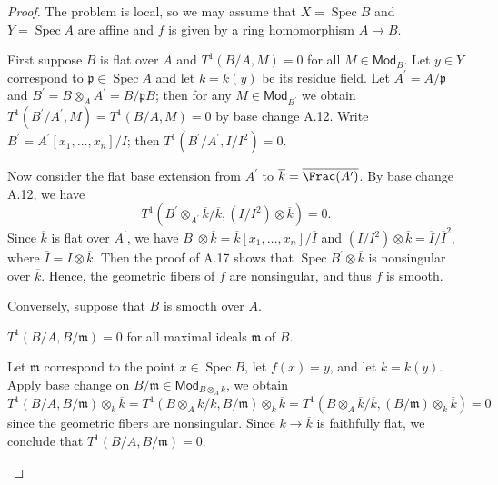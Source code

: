 \documentclass{article}
\theoremstyle{definition}
\newcommand{\Spec}{\operatorname{Spec}}
\begin{document}
\begin{proof}
The problem is local, so we may assume that \(X = \Spec B\) and \(Y = \Spec A\) are affine and \(f\) is given by a ring homomorphism \(A\to B\).

First suppose \(B\) is flat over \(A\) and \(T^{1}(B / A,M) = 0\) for all \(M\in \mathsf{Mod}_{B}\). Let \(y\in Y\) correspond to \(\mathfrak{p}\in \Spec A\) and let \(k = k(y)\) be its residue field. Let \(A^{\prime} = A / \mathfrak{p}\) and \(B^{\prime} = B\otimes_{A}A^{\prime} = B / \mathfrak{p}B\); then for any \(M\in \mathsf{Mod}_{B^{\prime}}\) we obtain \(T^{1}(B^{\prime} / A^{\prime},M) = T^{1}(B / A,M) = 0\) by base change A.12. Write \(B^{\prime} = A^{\prime}[x_{1},\ldots ,x_{n}] / I\); then \(T^{1}(B^{\prime} / A^{\prime},I / I^{2}) = 0\).

Now consider the flat base extension from \(A^{\prime}\) to \(\overline{k} = \overline{\Frac(A^{\prime})}\). By base change A.12, we have
\[
T^{1}(B^{\prime}\otimes_{A^{\prime}}\overline{k} /\overline{k},(I / I^{2})\otimes \overline{k}) = 0.
\]
Since \(\overline{k}\) is flat over \(A^{\prime}\), we have \(B^{\prime}\otimes \overline{k} = \overline{k}[x_{1},\ldots ,x_{n}] / \overline{I}\) and \((I / I^{2})\otimes \overline{k} = \overline{I} / \overline{I}^{2}\), where \(\overline{I} = I\otimes \overline{k}\). Then the proof of A.17 shows that \(\Spec B^{\prime}\otimes \overline{k}\) is nonsingular over \(\overline{k}\). Hence, the geometric fibers of \(f\) are nonsingular, and thus \(f\) is smooth.

Conversely, suppose that \(B\) is smooth over \(A\).

\begin{claim}
\(T^{1}(B / A,B / \mathfrak{m}) = 0\) for all maximal ideals \(\mathfrak{m}\) of \(B\).
\end{claim}
\begin{subproof}
Let \(\mathfrak{m}\) correspond to the point \(x\in \Spec B\), let \(f(x) = y\), and let \(k = k(y)\). Apply base change on \(B / \mathfrak{m}\in \mathsf{Mod}_{B\otimes_{A}k}\), we obtain
\[
T^{1}(B / A,B / \mathfrak{m})\otimes_{k}\overline{k} = T^{1}(B\otimes_{A}k / k,B / \mathfrak{m})\otimes_{k}\overline{k} = T^{1}(B \otimes_{A}\overline{k} /\overline{k},(B / \mathfrak{m})\otimes_{k}\overline{k}) = 0
\]
since the geometric fibers are nonsingular. Since \(k\to \overline{k}\) is faithfully flat, we conclude that \(T^{1}(B / A,B / \mathfrak{m}) = 0\).
\end{subproof}


\end{proof}
\end{document}
